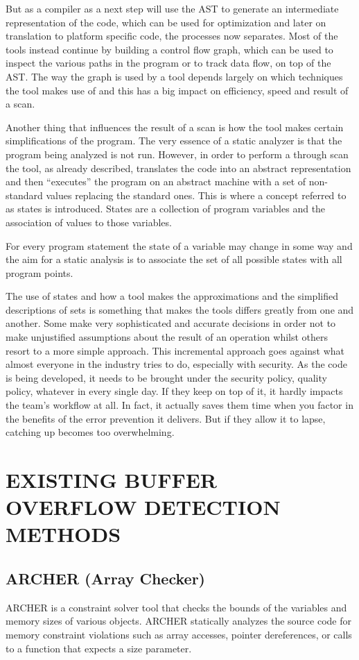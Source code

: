 But as a compiler as a next step will use the AST to generate an intermediate representation of the code, which can be used for optimization and later on translation to platform specific code, the processes now separates. Most of the tools instead continue by building a control flow graph, which can be used to inspect the various paths in the program or to track data flow, on top of the AST. The way the graph is used by a tool depends largely on which techniques the tool makes use of and this has a big impact on efficiency, speed and result of a scan.

Another thing that influences the result of a scan is how the tool makes certain simplifications of the program. The very essence of a static analyzer is that the program being analyzed is not run. However, in order to perform a through scan the tool, as already described, translates the code into an abstract representation and then “executes” the program on an abstract machine with a set of non-standard values replacing the standard ones. This is where a concept referred to as states is introduced. States are a collection of program variables and the association of values to those variables. 

For every program statement the state of a variable may change in some way and the aim for a static analysis is to associate the set of all possible states with all program points. 

The use of states and how a tool makes the approximations and the simplified descriptions of sets is something that makes the tools differs greatly from one and another. Some make very sophisticated and accurate decisions in order not to make unjustified assumptions about the result of an operation whilst others resort to a more simple approach. This incremental approach goes against what almost everyone in the industry tries to do, especially with security. As the code is being developed, it needs to be brought under the security policy, quality policy, whatever in every single day. If they keep on top of it, it hardly impacts the team’s workflow at all. In fact, it actually saves them time when you factor in the benefits of the error prevention it delivers. But if they allow it to lapse, catching up becomes too overwhelming. \cite{Five}

\section{EXISTING BUFFER OVERFLOW DETECTION METHODS}
\subsection{ARCHER (Array Checker)}
ARCHER is a constraint solver tool that checks the bounds of the variables and memory
sizes of various objects. ARCHER statically analyzes the source code for memory constraint violations such as array accesses, pointer dereferences, or calls to a function that expects a size parameter.

